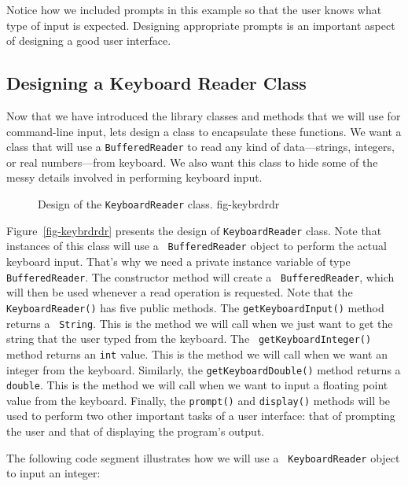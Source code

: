 \noindent Notice how we included prompts in this example 
so that the user knows what type of input is expected. Designing
appropriate prompts is an important aspect of designing a good user
interface.



\subsection{Designing a Keyboard Reader Class}

Now that we have introduced the library classes and methods that we
will use for command-line input, lets design a class to encapsulate
these functions. We want a class that will use a {\tt BufferedReader}
to read any kind of data---strings, integers, or real numbers---from
keyboard.  We also want this class to hide some of the messy details
involved in performing keyboard input.

\begin{figure}[h]
{Design of the {\tt KeyboardReader} class.}
{fig-keybrdrdr}

\end{figure}

Figure~\ref{fig-keybrdrdr} presents the design of {\tt KeyboardReader}
class.  Note that instances of this class will use a {\tt
BufferedReader} object to perform the actual keyboard input. That's
why we need a private instance variable of type {\tt
BufferedReader}. The constructor method will create a {\tt
BufferedReader}, which will then be used whenever a read operation is
requested.  Note that the {\tt KeyboardReader()} has five public
methods. The {\tt getKeyboardInput()} method returns a {\tt
String}. This is the method we will call when we just want to get the
string that the user typed from the keyboard.  The {\tt
getKeyboardInteger()} method returns an {\tt int} value. This is the
method we will call when we want an integer from the
keyboard. Similarly, the {\tt getKeyboardDouble()} method returns a
{\tt double}. This is the method we will call when we want to input a
floating point value from the keyboard. Finally, the {\tt prompt()}
and {\tt display()} methods will be used to perform two other
important tasks of a user interface: that of prompting the user and
that of displaying the program's output.

The following code segment illustrates how we will use a {\tt
Key\-board\-Read\-er} object to input an integer:


